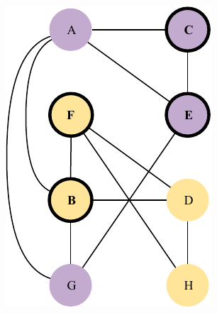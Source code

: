 \documentclass[a4paper, 10pt]{article}
\begin{document}
\begin{figure}[H]
\begin{subfigure}{0.19\textwidth}
        \includegraphics[width=1\linewidth]{5_23.pdf}
    \end{subfigure}
    \hfill
    \begin{subfigure}{0.19\textwidth}
        \centering

\end{subfigure}
\end{figure}
\end{document}

